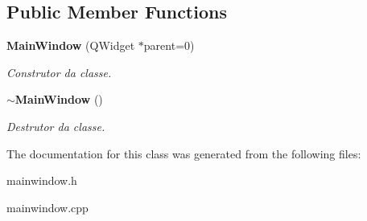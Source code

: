 \subsection*{Public Member Functions}
\begin{DoxyCompactItemize}
\item 
\mbox{\label{class_main_window_a8b244be8b7b7db1b08de2a2acb9409db}} 
\textbf{ Main\+Window} (Q\+Widget $\ast$parent=0)
\begin{DoxyCompactList}\small\item\em Construtor da classe. \end{DoxyCompactList}\item 
\mbox{\label{class_main_window_ae98d00a93bc118200eeef9f9bba1dba7}} 
\textbf{ $\sim$\+Main\+Window} ()
\begin{DoxyCompactList}\small\item\em Destrutor da classe. \end{DoxyCompactList}\end{DoxyCompactItemize}


The documentation for this class was generated from the following files\+:\begin{DoxyCompactItemize}
\item 
mainwindow.\+h\item 
mainwindow.\+cpp\end{DoxyCompactItemize}
